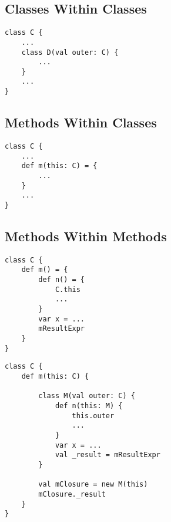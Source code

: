 \subsection{Classes Within Classes}

\begin{lstlisting}
class C {
	...
	class D(val outer: C) {
		...
	}
	...
}
\end{lstlisting}

\subsection{Methods Within Classes}

\begin{lstlisting}
class C {
	...
	def m(this: C) = {
		...
	}
	...
}
\end{lstlisting}

\subsection{Methods Within Methods}

\begin{lstlisting}
class C {
	def m() = {
		def n() = {
			C.this
			...
		}
		var x = ...
		mResultExpr
	}
}
\end{lstlisting}

\begin{lstlisting}
class C {
	def m(this: C) {

		class M(val outer: C) {
			def n(this: M) {
				this.outer
				...
			}
			var x = ...
			val _result = mResultExpr
		}

		val mClosure = new M(this)
		mClosure._result
	}
}
\end{lstlisting}

